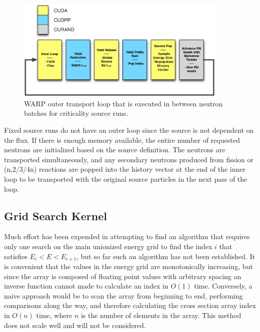 \begin{figure}[h!] 
\centering
\includegraphics[width=0.9\textwidth]{graphics/warp_outer_loop.eps}
\caption{WARP outer transport loop that is executed in between neutron batches for criticality source runs. \label{warp_outer_loop} }
\end{figure} %

Fixed source runs do not have an outer loop since the source is not dependent on the flux.  If there is enough memory available, the entire number of requested neutrons are initialized based on the source definition.  The neutrons are transported simultaneously, and any secondary neutrons produced from fission or (n,2/3/4n) reactions are popped into the history vector at the end of the inner loop to be transported with the original source particles in the next pass of the loop.

\subsection{Grid Search Kernel}

Much effort has been expended in attempting to find an algorithm that requires only one search on the main unionized energy grid to find the index $i$ that satisfies $E_i<E<E_{i+1}$, but so far such an algorithm has not been established.  It is convenient that the values in the energy grid are monotonically increasing, but since the array is composed of floating point values with arbitrary spacing an inverse function cannot made to calculate an index in $O(1)$ time.  Conversely, a naive approach would be to scan the array from beginning to end, performing comparisons along the way, and therefore calculating the cross section array index in $O(n)$ time, where $n$ is the number of elements in the array.  This method does not scale well and will not be considered.  

